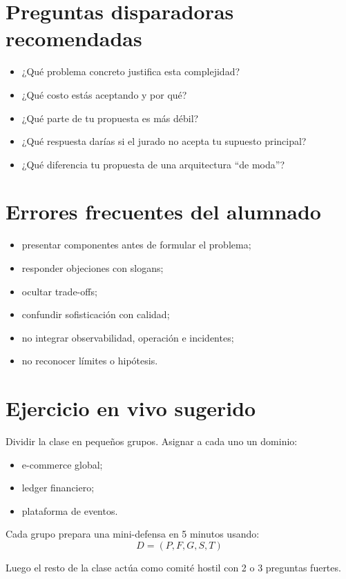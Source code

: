 \documentclass[variant=docente,cover=institutional,mode=screen]{ua-engineering-v6-article}
\begin{document}
\section{Preguntas disparadoras recomendadas}

\begin{itemize}
\item ¿Qué problema concreto justifica esta complejidad?
\item ¿Qué costo estás aceptando y por qué?
\item ¿Qué parte de tu propuesta es más débil?
\item ¿Qué respuesta darías si el jurado no acepta tu supuesto principal?
\item ¿Qué diferencia tu propuesta de una arquitectura “de moda”?
\end{itemize}

\section{Errores frecuentes del alumnado}

\begin{itemize}
\item presentar componentes antes de formular el problema;
\item responder objeciones con slogans;
\item ocultar trade-offs;
\item confundir sofisticación con calidad;
\item no integrar observabilidad, operación e incidentes;
\item no reconocer límites o hipótesis.
\end{itemize}

\section{Ejercicio en vivo sugerido}

Dividir la clase en pequeños grupos. Asignar a cada uno un dominio:
\begin{itemize}
\item e-commerce global;
\item ledger financiero;
\item plataforma de eventos.
\end{itemize}

Cada grupo prepara una mini-defensa en 5 minutos usando:
\[
D = (P,F,G,S,T)
\]

Luego el resto de la clase actúa como comité hostil con 2 o 3 preguntas fuertes.
\end{document}
